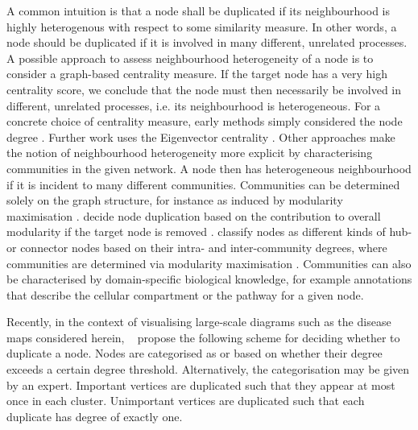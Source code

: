 \documentclass[
	fontsize=10pt, %
	twoside=true, %
	secnumdepth=1, %
  toc=indentunnumbered %
]{kaobook}
\begin{document}
A common intuition is that a node shall be duplicated if its neighbourhood is
highly heterogenous with respect to some similarity measure. In other words, a
node should be duplicated if it is involved in many different, unrelated
processes.
%
A possible approach to assess neighbourhood heterogeneity of a node is to
consider a graph-based centrality measure. If the target node has a very high
centrality score, we conclude that the node must then necessarily be involved in
different, unrelated processes, i.e. its neighbourhood is heterogeneous. For a
concrete choice of centrality measure, early methods simply considered the node
degree \cite{ma_ReconstructionMetabolicNetworks_2003,schuster_exploring_2002}.
Further work uses the Eigenvector centrality \cite{manipur_clustering_2020}.
%
Other approaches make the notion of neighbourhood heterogeneity more explicit by
characterising communities in the given network. A node then has heterogeneous
neighbourhood if it is incident to many different communities. Communities can
be determined solely on the graph structure, for instance as induced by
modularity maximisation \cite{newman_modularity_2006}.
\citeauthor{huss_CurrencyCommodityMetabolites_2007} decide node duplication
based on the contribution to overall modularity if the target node is removed
\cite{huss_CurrencyCommodityMetabolites_2007}.
\citeauthor{guimera_FunctionalCartographyComplex_2005} classify nodes as
different kinds of hub- or connector nodes based on their intra- and
inter-community degrees, where communities are determined via modularity
maximisation \cite{guimera_FunctionalCartographyComplex_2005}. Communities can
also be characterised by domain-specific biological knowledge, for example
annotations that describe the cellular compartment
\cite{manipur_clustering_2020} or the pathway
\cite{rohrschneider_NovelGridBasedVisualization_2010,
  joshi-tope_ReactomeKnowledgebaseBiological_2005} for a given node.

Recently, in the context of visualising large-scale diagrams such as the disease
maps considered herein,
\citeauthor{wu_MultilevelAreaBalancing_2020}~\cite{wu_MultilevelAreaBalancing_2020}
propose the following scheme for deciding whether to duplicate a node. Nodes are
categorised as  or  based on whether their
degree exceeds a certain degree threshold. Alternatively, the categorisation may
be given by an expert.
% 
Important vertices are duplicated such that they appear at most once in each
cluster. Unimportant vertices are duplicated such that each duplicate has degree
of exactly one.
\end{document}
